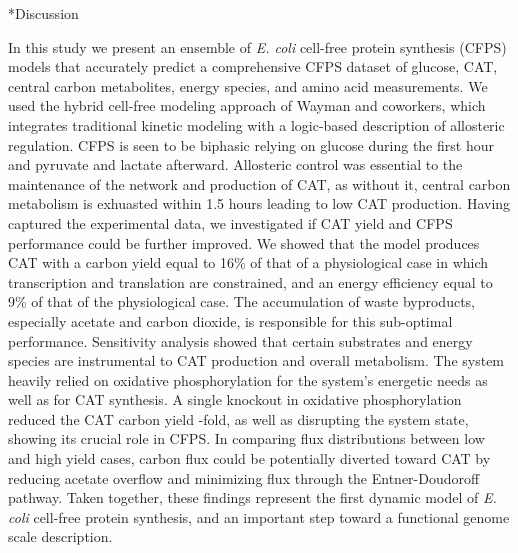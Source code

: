 \documentclass[12pt]{article}
\makeatletter
\renewcommand\section{\@startsection
	{subsection}{2}{0mm}
	{-0.2in}
	{0.05\baselineskip}
	{\normalfont\large\bfseries}}
\makeatother
\begin{document}
\clearpage

\section*{Discussion}


In this study we present an ensemble of \textit{E. coli} cell-free protein synthesis (CFPS) models that accurately predict a comprehensive CFPS dataset of glucose, CAT, central carbon metabolites, energy species, and amino acid measurements.
We used the hybrid cell-free modeling approach of Wayman and coworkers, which integrates traditional kinetic modeling with a logic-based description of allosteric regulation.
CFPS is seen to be biphasic relying on glucose during the first hour and pyruvate and lactate afterward.
Allosteric control was essential to the maintenance of the network and production of CAT, as without it, central carbon metabolism is exhuasted within 1.5 hours leading to low CAT production.
Having captured the experimental data, we investigated if CAT yield and CFPS performance could be further improved.
We showed that the model produces CAT with a carbon yield equal to 16\% of that of a physiological case in which transcription and translation are constrained, and an energy efficiency equal to 9\% of that of the physiological case.
The accumulation of waste byproducts, especially acetate and carbon dioxide, is responsible for this sub-optimal performance.
Sensitivity analysis showed that certain substrates and energy species are instrumental to CAT production and overall metabolism.
The system heavily relied on oxidative phosphorylation for the system's energetic needs as well as for CAT synthesis.
A single knockout in oxidative phosphorylation reduced the CAT carbon yield -fold, as well as disrupting the system state, showing its crucial role in CFPS.
In comparing flux distributions between low and high yield cases, carbon flux could be potentially diverted toward CAT by reducing acetate overflow and minimizing flux through the Entner-Doudoroff pathway.
Taken together, these findings represent the first dynamic model of \textit{E. coli} cell-free protein synthesis, and an important step toward a functional genome scale description.
\end{document}
